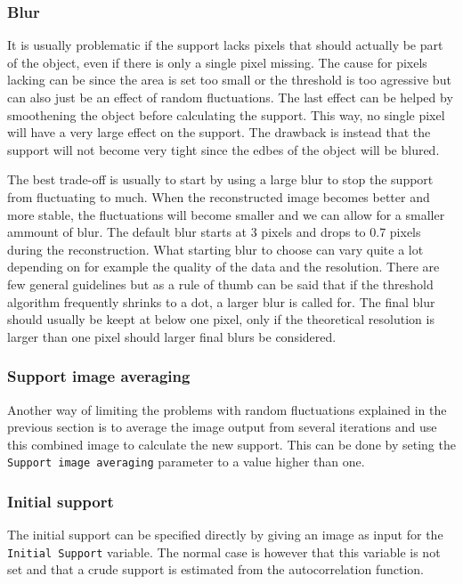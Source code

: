 \documentclass[11pt,a4paper]{article}
\newcommand{\com}[1]{\texttt{#1}}
\begin{document}
\subsubsection{Blur}
It is usually problematic if the support lacks pixels that should actually be part of the object, even if there is only a single pixel missing. The cause for pixels lacking can be since the area is set too small or the threshold is too agressive but can also just be an effect of random fluctuations. The last effect can be helped by smoothening the object before calculating the support. This way, no single pixel will have a very large effect on the support. The drawback is instead that the support will not become very tight since the edbes of the object will be blured.

The best trade-off is usually to start by using a large blur to stop the support from fluctuating to much. When the reconstructed image becomes better and more stable, the fluctuations will become smaller and we can allow for a smaller ammount of blur. The default blur starts at 3 pixels and drops to 0.7 pixels during the reconstruction. What starting blur to choose can vary quite a lot depending on for example the quality of the data and the resolution. There are few general guidelines but as a rule of thumb can be said that if the threshold algorithm frequently shrinks to a dot, a larger blur is called for. The final blur should usually be keept at below one pixel, only if the theoretical resolution is larger than one pixel should larger final blurs be considered.

\subsubsection{Support image averaging}
Another way of limiting the problems with random fluctuations explained in the previous section is to average the image output from several iterations and use this combined image to calculate the new support. This can be done by seting the \com{Support image averaging} parameter to a value higher than one.

\subsubsection{Initial support}
The initial support can be specified directly by giving an image as input for the \com{Initial Support} variable. The normal case is however that this variable is not set and that a crude support is estimated from the autocorrelation function.
\end{document}
